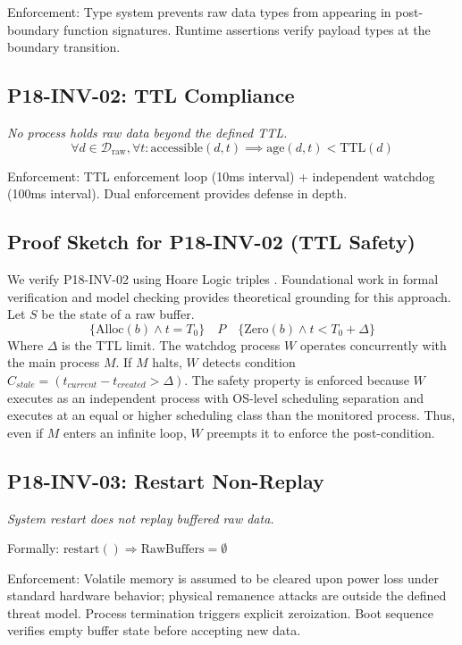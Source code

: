 \documentclass[conference]{IEEEtran}
\begin{document}
Enforcement: Type system prevents raw data types from appearing in post-boundary function signatures. Runtime assertions verify payload types at the boundary transition.

\subsection{P18-INV-02: TTL Compliance}
\textit{No process holds raw data beyond the defined TTL.}
\begin{equation}
\forall d \in \mathcal{D}_{\mathrm{raw}}, \forall t: \mathrm{accessible}(d, t) \implies \mathrm{age}(d, t) < \mathrm{TTL}(d)
\end{equation}

Enforcement: TTL enforcement loop (10ms interval) + independent watchdog (100ms interval). Dual enforcement provides defense in depth.

\subsection{Proof Sketch for P18-INV-02 (TTL Safety)}
We verify P18-INV-02 using Hoare Logic triples \cite{b19}. Foundational work in formal verification \cite{b15} and model checking \cite{b14} provides theoretical grounding for this approach. Let $S$ be the state of a raw buffer.
\begin{equation}
\{ \text{Alloc}(b) \land t = T_0 \} \quad P \quad \{ \text{Zero}(b) \land t < T_0 + \Delta \}
\end{equation}
Where $\Delta$ is the TTL limit.
The watchdog process $W$ operates concurrently with the main process $M$.
If $M$ halts, $W$ detects condition $C_{stale} = (t_{current} - t_{created} > \Delta)$.
The safety property is enforced because $W$ executes as an independent process with OS-level scheduling separation and executes at an equal or higher scheduling class than the monitored process. Thus, even if $M$ enters an infinite loop, $W$ preempts it to enforce the post-condition.

\subsection{P18-INV-03: Restart Non-Replay}
\textit{System restart does not replay buffered raw data.}

Formally: $\text{restart}() \Rightarrow \text{RawBuffers} = \emptyset$

Enforcement: Volatile memory is assumed to be cleared upon power loss under standard hardware behavior; physical remanence attacks are outside the defined threat model. Process termination triggers explicit zeroization. Boot sequence verifies empty buffer state before accepting new data.
\end{document}
